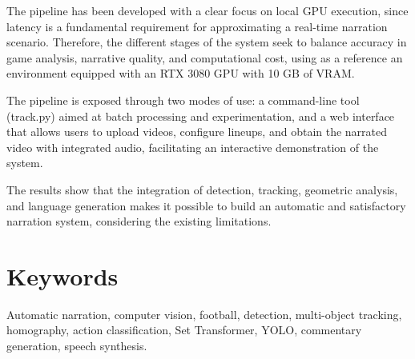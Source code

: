 The pipeline has been developed with a clear focus on local GPU execution, since latency is a fundamental requirement for approximating a real-time narration scenario. Therefore, the different stages of the system seek to balance accuracy in game analysis, narrative quality, and computational cost, using as a reference an environment equipped with an RTX 3080 GPU with 10 GB of VRAM.

The pipeline is exposed through two modes of use: a command-line tool (track.py) aimed at batch processing and experimentation, and a web interface that allows users to upload videos, configure lineups, and obtain the narrated video with integrated audio, facilitating an interactive demonstration of the system.

The results show that the integration of detection, tracking, geometric analysis, and language generation makes it possible to build an automatic and satisfactory narration system, considering the existing limitations.

\section*{Keywords}

\noindent Automatic narration, computer vision, football, detection, multi-object tracking, homography, action classification, Set Transformer, YOLO, commentary generation, speech synthesis.

\endgroup